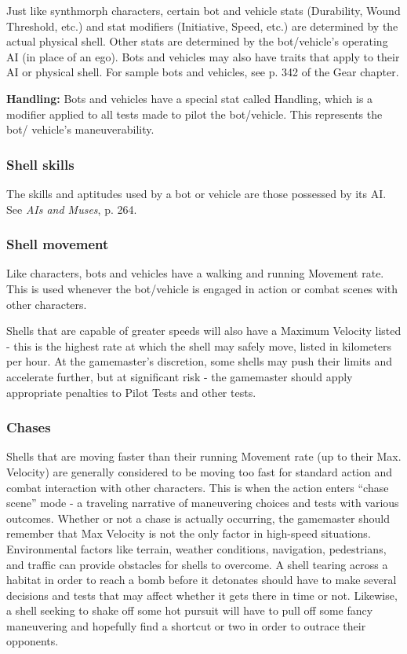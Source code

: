 Just like synthmorph characters, certain bot and vehicle stats (Durability, Wound Threshold, etc.) and stat modifiers (Initiative, Speed, etc.) are determined by the actual physical shell. Other stats are determined by the bot/vehicle’s operating AI (in place of an ego). Bots and vehicles may also have traits that apply to their AI or physical shell. For sample bots and vehicles, see p. 342 of the Gear chapter.

\textbf{Handling:} Bots and vehicles have a special stat called Handling, which is a modifier applied to all tests made to pilot the bot/vehicle. This represents the bot/ vehicle’s maneuverability.

\subsubsection{Shell skills}

The skills and aptitudes used by a bot or vehicle are those possessed by its AI. See \emph{AIs and Muses}, p. 264.

\subsubsection{Shell movement}

Like characters, bots and vehicles have a walking and running Movement rate. This is used whenever the bot/vehicle is engaged in action or combat scenes with other characters.

Shells that are capable of greater speeds will also have a Maximum Velocity listed - this is the highest rate at which the shell may safely move, listed in kilometers per hour. At the gamemaster’s discretion, some shells may push their limits and accelerate further, but at significant risk -  the gamemaster should apply appropriate penalties to Pilot Tests and other tests.

\subsubsection{Chases}

Shells that are moving faster than their running Movement rate (up to their Max. Velocity) are generally considered to be moving too fast for standard action and combat interaction with other characters. This is when the action enters ``chase scene'' mode - a traveling narrative of maneuvering choices and tests with various outcomes. Whether or not a chase is actually occurring, the gamemaster should remember that Max Velocity is not the only factor in high-speed situations. Environmental factors like terrain, weather conditions, navigation, pedestrians, and traffic can provide obstacles for shells to overcome. A shell tearing across a habitat in order to reach a bomb before it detonates should have to make several decisions and tests that may affect whether it gets there in time or not. Likewise, a shell seeking to shake off some hot pursuit will have to pull off some fancy maneuvering and hopefully find a shortcut or two in order to outrace their opponents.

